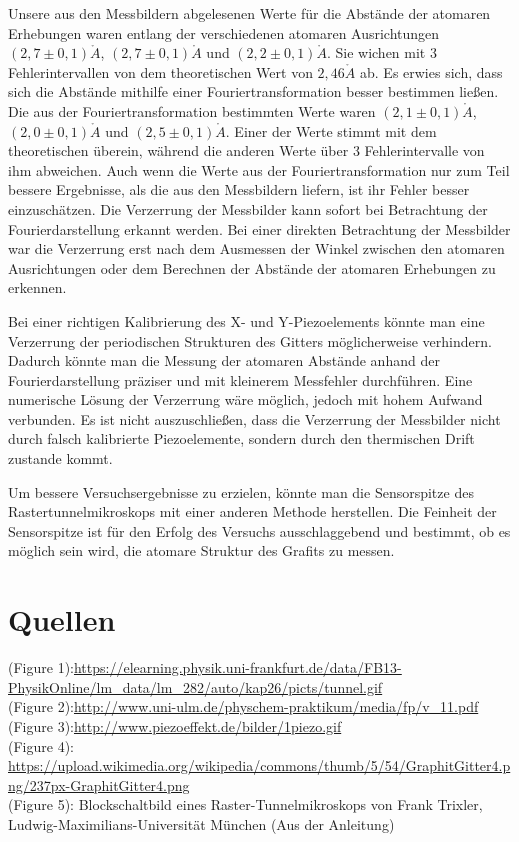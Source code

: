 \documentclass[10pt,a4paper]{article}
\begin{document}
Unsere aus den Messbildern abgelesenen Werte für die Abstände der atomaren Erhebungen waren entlang der verschiedenen atomaren Ausrichtungen $(2,7 \pm 0,1) \mathring{A}$, $(2,7 \pm 0,1) \mathring{A}$ und $(2,2 \pm 0,1) \mathring{A}$. Sie wichen mit 3 Fehlerintervallen von dem theoretischen Wert von $2,46 \mathring{A}$ ab. Es erwies sich, dass sich die Abstände mithilfe einer Fouriertransformation besser bestimmen ließen. Die aus der Fouriertransformation bestimmten Werte waren $(2,1\pm0,1)\mathring{A}$, $(2,0\pm0,1)\mathring{A}$ und $(2,5\pm0,1)\mathring{A}$. Einer der Werte stimmt mit dem theoretischen überein, während die anderen Werte über 3 Fehlerintervalle von ihm abweichen.
Auch wenn die Werte aus der Fouriertransformation nur zum Teil bessere Ergebnisse, als die aus den Messbildern liefern, ist ihr Fehler besser einzuschätzen. Die Verzerrung der Messbilder kann sofort bei Betrachtung der Fourierdarstellung erkannt werden. Bei einer direkten Betrachtung der Messbilder war die Verzerrung erst nach dem Ausmessen der Winkel zwischen den atomaren Ausrichtungen oder dem Berechnen der Abstände der atomaren Erhebungen zu erkennen.

Bei einer richtigen Kalibrierung des X- und Y-Piezoelements könnte man eine Verzerrung der periodischen Strukturen des Gitters möglicherweise verhindern. Dadurch könnte man die Messung der atomaren Abstände anhand der Fourierdarstellung präziser und mit kleinerem Messfehler durchführen. Eine numerische Lösung der Verzerrung wäre möglich, jedoch mit hohem Aufwand verbunden.
Es ist nicht auszuschließen, dass die Verzerrung der Messbilder nicht durch falsch kalibrierte Piezoelemente, sondern durch den thermischen Drift zustande kommt.

Um bessere Versuchsergebnisse zu erzielen, könnte man die Sensorspitze des Rastertunnelmikroskops mit einer anderen Methode herstellen. Die Feinheit der Sensorspitze ist für den Erfolg des Versuchs ausschlaggebend und bestimmt, ob es möglich sein wird, die atomare Struktur des Grafits zu messen.




\section{Quellen}
(Figure 1):\url{https://elearning.physik.uni-frankfurt.de/data/FB13-PhysikOnline/lm_data/lm_282/auto/kap26/picts/tunnel.gif}\\
(Figure 2):\url{http://www.uni-ulm.de/physchem-praktikum/media/fp/v_11.pdf}\\
(Figure 3):\url{http://www.piezoeffekt.de/bilder/1piezo.gif}\\
(Figure 4): \url{https://upload.wikimedia.org/wikipedia/commons/thumb/5/54/GraphitGitter4.png/237px-GraphitGitter4.png}\\
(Figure 5): Blockschaltbild eines Raster-Tunnelmikroskops von Frank Trixler, Ludwig-Maximilians-Universität München (Aus der Anleitung)
\end{document}
